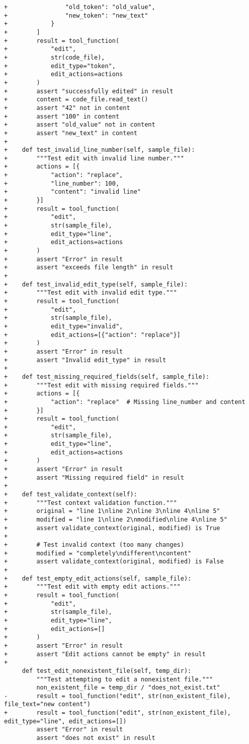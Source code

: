 \begin{lstlisting}[style=diffstyle]
+                "old_token": "old_value",
+                "new_token": "new_text"
+            }
+        ]
+        result = tool_function(
+            "edit",
+            str(code_file),
+            edit_type="token",
+            edit_actions=actions
+        )
+        assert "successfully edited" in result
+        content = code_file.read_text()
+        assert "42" not in content
+        assert "100" in content
+        assert "old_value" not in content
+        assert "new_text" in content
+
+    def test_invalid_line_number(self, sample_file):
+        """Test edit with invalid line number."""
+        actions = [{
+            "action": "replace",
+            "line_number": 100,
+            "content": "invalid line"
+        }]
+        result = tool_function(
+            "edit",
+            str(sample_file),
+            edit_type="line",
+            edit_actions=actions
+        )
+        assert "Error" in result
+        assert "exceeds file length" in result
+
+    def test_invalid_edit_type(self, sample_file):
+        """Test edit with invalid edit type."""
+        result = tool_function(
+            "edit",
+            str(sample_file),
+            edit_type="invalid",
+            edit_actions=[{"action": "replace"}]
+        )
+        assert "Error" in result
+        assert "Invalid edit_type" in result
+
+    def test_missing_required_fields(self, sample_file):
+        """Test edit with missing required fields."""
+        actions = [{
+            "action": "replace"  # Missing line_number and content
+        }]
+        result = tool_function(
+            "edit",
+            str(sample_file),
+            edit_type="line",
+            edit_actions=actions
+        )
+        assert "Error" in result
+        assert "Missing required field" in result
+
+    def test_validate_context(self):
+        """Test context validation function."""
+        original = "line 1\nline 2\nline 3\nline 4\nline 5"
+        modified = "line 1\nline 2\nmodified\nline 4\nline 5"
+        assert validate_context(original, modified) is True
+
+        # Test invalid context (too many changes)
+        modified = "completely\ndifferent\ncontent"
+        assert validate_context(original, modified) is False
+
+    def test_empty_edit_actions(self, sample_file):
+        """Test edit with empty edit actions."""
+        result = tool_function(
+            "edit",
+            str(sample_file),
+            edit_type="line",
+            edit_actions=[]
+        )
+        assert "Error" in result
+        assert "Edit actions cannot be empty" in result
+
     def test_edit_nonexistent_file(self, temp_dir):
         """Test attempting to edit a nonexistent file."""
         non_existent_file = temp_dir / "does_not_exist.txt"
-        result = tool_function("edit", str(non_existent_file), file_text="new content")
+        result = tool_function("edit", str(non_existent_file), edit_type="line", edit_actions=[])
         assert "Error" in result
         assert "does not exist" in result
 

\end{lstlisting}
